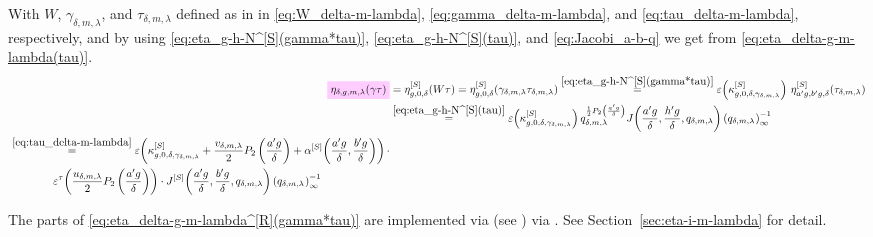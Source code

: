 \documentclass{article}
\begin{document}
With $W$, $\gamma_{\delta,m,\lambda}$, and $\tau_{\delta,m,\lambda}$
defined as in in \eqref{eq:W_delta-m-lambda},
\eqref{eq:gamma_delta-m-lambda}, and \eqref{eq:tau_delta-m-lambda},
respectively, and by using \eqref{eq:eta_g-h-N^[S](gamma*tau)},
\eqref{eq:eta_g-h-N^[S](tau)}, and \eqref{eq:Jacobi_a-b-q} we get from
\eqref{eq:eta_delta-g-m-lambda(tau)}.
\begin{align}
  \defineNotation[eta-delta-g-m-lambda-gamma-tau-Robins]
    {\eta_{\delta,g,m,\lambda}(\gamma\tau)}
  &=
    \eta_{g,0,\delta}^{[S]}(W\tau)
  =
    \eta_{g,0,\delta}^{[S]}(\gamma_{\delta,m,\lambda}\tau_{\delta,m,\lambda})
   \eqby{eq:eta_g-h-N^[S](gamma*tau)}
    \unityPower{\kappa_{g,0,\delta,\gamma_{\delta,m,\lambda}}^{[S]}}\,
    \eta_{a' g, b' g,\delta}^{[S]}(\tau_{\delta,m,\lambda})
  \notag\\
  &\eqby{eq:eta_g-h-N^[S](tau)}
    \unityPower{\kappa_{g,0,\delta,\gamma_{\delta,m,\lambda}}^{[S]}}
  q_{\delta,m,\lambda}^{\frac{1}{2} P_2
    \left(\frac{a'g}{\delta}\right)}
    \jacobiAlpha{\frac{a' g}{\delta}}{\frac{h' g}{\delta}}{q_{\delta,m,\lambda}}
    \eulerFunction[q_{\delta,m,\lambda}]{}^{-1}
    \notag\\
  \begin{split}
    &\eqby{eq:tau_delta-m-lambda}
    \unityPower{
      \kappa_{g,0,\delta,\gamma_{\delta,m,\lambda}}^{[S]}
      +
      \frac{v_{\delta,m,\lambda}}{2} P_2\left(\frac{a' g}{\delta}\right)
      +
      \alphaSchoenebergContribution{\frac{a' g}{\delta}}{\frac{b' g}{\delta}}
    }
    \cdot
    \\
    &\qquad\qquad
    \unityPowerTau{
      \frac{u_{\delta,m,\lambda}}{2} P_2\left(\frac{a' g}{\delta}\right)}
    \cdot
    \jacobiSchoeneberg{\frac{a' g}{\delta}}{\frac{b' g}{\delta}}{q_{\delta,m,\lambda}}
    \eulerFunction[q_{\delta,m,\lambda}]{}^{-1}
  \end{split}
  \label{eq:eta_delta-g-m-lambda^[R](gamma*tau)}
\end{align}


The parts of \eqref{eq:eta_delta-g-m-lambda^[R](gamma*tau)} are
implemented via \textcolor{blue}{} (see
) via .
See Section~\ref{sec:eta-i-m-lambda} for detail.
\end{document}
